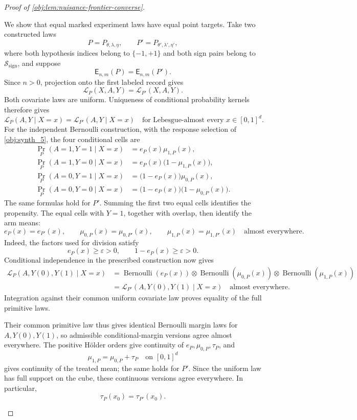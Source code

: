 \begin{proof}[Proof of \cref{obj:lem:nuisance-frontier-converse}]
\begin{enumerate}
We show that equal marked experiment laws have equal point targets. Take two constructed laws
\[
P=P_{\theta,\lambda,\eta},\qquad
P'=P_{\theta',\lambda',\eta'},
\]
where both hypothesis indices belong to \(\{-1,+1\}\) and both sign pairs belong to \(\mathcal S_{\mathrm{sign}}\), and suppose
\[
\mathsf E_{n,m}(P)=\mathsf E_{n,m}(P').
\]
Since \(n>0\), projection onto the first labeled record gives
\[
\mathcal L_P(X,A,Y)=\mathcal L_{P'}(X,A,Y).
\]
Both covariate laws are uniform. Uniqueness of conditional probability kernels therefore gives
\[
\mathcal L_P(A,Y\mid X=x)
=
\mathcal L_{P'}(A,Y\mid X=x)
\quad\text{for Lebesgue-almost every }x\in[0,1]^d.
\]
For the independent Bernoulli construction, with the response selection of \cref{obj:synth_5}, the four conditional cells are
\[
\begin{aligned}
\Pr_P(A=1,Y=1\mid X=x)
 &=e_P(x)\mu_{1,P}(x),\\
\Pr_P(A=1,Y=0\mid X=x)
 &=e_P(x)\bigl(1-\mu_{1,P}(x)\bigr),\\
\Pr_P(A=0,Y=1\mid X=x)
 &=\bigl(1-e_P(x)\bigr)\mu_{0,P}(x),\\
\Pr_P(A=0,Y=0\mid X=x)
 &=\bigl(1-e_P(x)\bigr)\bigl(1-\mu_{0,P}(x)\bigr).
\end{aligned}
\]
The same formulas hold for \(P'\). Summing the first two equal cells identifies the propensity. The equal cells with \(Y=1\), together with overlap, then identify the arm means:
\[
e_P(x)=e_{P'}(x),\qquad
\mu_{0,P}(x)=\mu_{0,P'}(x),\qquad
\mu_{1,P}(x)=\mu_{1,P'}(x)
\quad\text{almost everywhere}.
\]
Indeed, the factors used for division satisfy
\[
e_P(x)\ge\varepsilon>0,\qquad 1-e_P(x)\ge\varepsilon>0.
\]
Conditional independence in the prescribed construction now gives
\[
\begin{aligned}
\mathcal L_P(A,Y(0),Y(1)\mid X=x)
&=\operatorname{Bernoulli}(e_P(x))
  \otimes\operatorname{Bernoulli}(\mu_{0,P}(x))
  \otimes\operatorname{Bernoulli}(\mu_{1,P}(x))\\
&=\mathcal L_{P'}(A,Y(0),Y(1)\mid X=x)
\quad\text{almost everywhere}.
\end{aligned}
\]
Integration against their common uniform covariate law proves equality of the full primitive laws.

Their common primitive law thus gives identical Bernoulli margin laws for \(A,Y(0),Y(1)\), so admissible conditional-margin versions agree almost everywhere. The positive Hölder orders give continuity of \(e_P,\mu_{0,P},\tau_P\), and
\[
\mu_{1,P}=\mu_{0,P}+\tau_P
\quad\text{on }[0,1]^d
\]
gives continuity of the treated mean; the same holds for \(P'\). Since the uniform law has full support on the cube, these continuous versions agree everywhere. In particular,
\[
\tau_P(x_0)=\tau_{P'}(x_0).
\]


\end{enumerate}
\end{proof}
